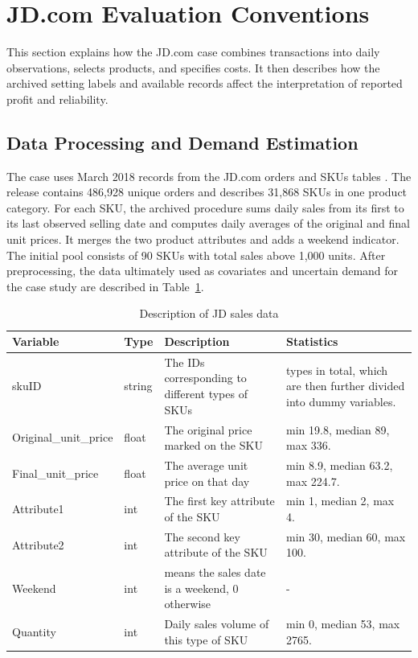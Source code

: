 \section{JD.com Evaluation Conventions}\label{app:case-detail}

This section explains how the JD.com case combines transactions into daily observations, selects products, and specifies costs. It then describes how the archived setting labels and available records affect the interpretation of reported profit and reliability.

\subsection{Data Processing and Demand Estimation}\label{app::caseData}

The case uses March 2018 records from the JD.com orders and SKUs tables \citep{2024JD}. The release contains 486,928 unique orders and describes 31,868 SKUs in one product category. For each SKU, the archived procedure sums daily sales from its first to its last observed selling date and computes daily averages of the original and final unit prices. It merges the two product attributes and adds a weekend indicator. The initial pool consists of 90 SKUs with total sales above 1,000 units. After preprocessing, the data ultimately used as covariates and uncertain demand for the case study are described in Table~\ref{tab::real-data-description}. 

\begin{table}[H]
\centering
\caption{Description of JD sales data\label{tab::real-data-description}}
{%
\small
\setlength{\tabcolsep}{3.5pt}
\begin{tabularx}{\linewidth}{@{}l l >{\raggedright\arraybackslash}X >{\raggedright\arraybackslash}X@{}}
\toprule
Variable & Type & Description & Statistics \\ 
\midrule
skuID  & string & The IDs corresponding to different types of SKUs & 90 types in total, which are then further divided into dummy variables. \\
Original\_unit\_price & float & The original price marked on the SKU & min 19.8, median 89, max 336. \\
Final\_unit\_price & float & The average unit price on that day & min 8.9, median 63.2, max 224.7. \\
Attribute1 & int & The first key attribute of the SKU & min 1, median 2, max 4. \\
Attribute2 & int & The second key attribute of the SKU & min 30, median 60, max 100. \\
Weekend & int & 1 means the sales date is a weekend, 0 otherwise & - \\
Quantity & int & Daily sales volume of this type of SKU & min 0, median 53, max 2765. \\ 
\bottomrule
\end{tabularx}%
}
{}
\end{table}

